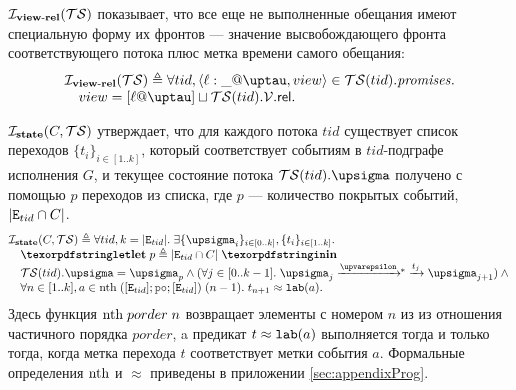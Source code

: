   $\mathcal{I}_{\rm \bf view\text{-}rel}(\mathcal{TS})$ показывает, что все еще не выполненные обещания имеют специальную форму
  их фронтов --- значение высвобождающего фронта соответствующего потока плюс метка времени самого обещания:
  \[\inarr{
  \invViewRel(\TSf) \defeq \forall tid, \msg{\loc}{\_}{\tau}{view} \in \TSf(tid).\PromSet. \\
    \quad view = [\loc @ \tau] \sqcup \TSf(tid).\View.\viewfRel. \\
  }\]

  $\mathcal{I}_{\rm \bf state}(C, \mathcal{TS})$ утверждает, что для каждого потока $tid$ существует список переходов $\{t_i\}_{i \in [1..k]}$,
  который соответствует событиям в $tid$-подграфе исполнения $G$, и текущее состояние потока $\TSf(tid).\sigma$
  получено с помощью $p$ переходов из списка, где $p$ --- количество покрытых событий, $|{\mathtt{E}}_{tid} \cap C|$.
  \[\inarr{
  \invState(C, \TSf) \defeq \forall tid, k = |\lEID|. \;
     \exists \{\pstate_i\}_{i \in [0 .. k]}, \{t_i\}_{i \in [1..k]}. \; \\
  \quad \letdef{p}{|\lEID \cap C|} \\
  \quad \TSf(tid).\pstate = \pstate_{p} \land 
    (\forall j \in [0..k-1]. \; \pstate_j \astep{\epsilon}\!\!^{*}\astep{t_j} \pstate_{j + 1})\land {} \\
  \quad \forall n \in [1..k], a \in \nthf \; ([\lEID]; \lPO; [\lEID]) \; (n - 1). \;
    t_{n + 1} \approx \lLAB(a).
  }\]
  Здесь функция $\mathrm{nth} \; porder \; n$ возвращает
  элементы с номером $n$ из из отношения частичного порядка $porder$, 
  a предикат $t \approx {\mathtt{lab}}(a)$ выполняется тогда и только тогда, когда метка перехода $t$
  соответствует метки события $a$.
  Формальные определения  $\mathrm{nth}$ и $\approx$ приведены в приложении \ref{sec:appendixProg}.




